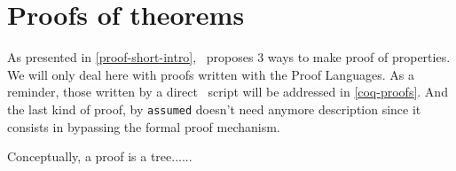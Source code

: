 


\section{Proofs of theorems}
As presented in \ref{proof-short-intro}, \focal\ proposes 3 ways to
make proof of properties. We will only deal here with proofs written
with the \focal Proof Languages. As a reminder, those written by a
direct \coq\ script will be addressed in \ref{coq-proofs}. And the
last kind of proof, by {\tt assumed} doesn't need anymore description
since it consists in bypassing the formal proof mechanism.

Conceptually, a proof is a tree......
